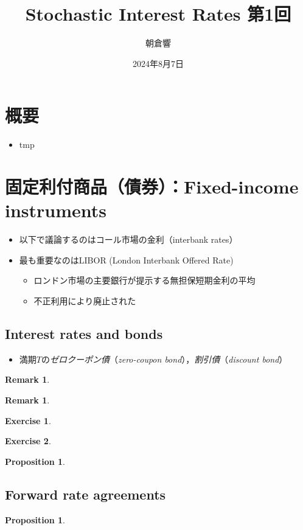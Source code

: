 \documentclass[a4paper, lualatex, ja=standard]{bxjsarticle}
\title{Stochastic Interest Rates 第1回}
\author{朝倉響}
\date{2024年8月7日}
\theoremstyle{theorem}
\newtheorem{prop}[thm]{Proposition}
\theoremstyle{definition}
\newtheorem{rem}[thm]{Remark}
\newtheorem{excs}{Exercise}[section]
\begin{document}
\maketitle

\section*{概要}
\begin{itemize}
  \item tmp
\end{itemize}

\section{固定利付商品（債券）：Fixed-income instruments}
\begin{itemize}
  \item 以下で議論するのはコール市場の金利（interbank rates）
  \item 最も重要なのはLIBOR (London Interbank Offered Rate)
  \begin{itemize}
    \item ロンドン市場の主要銀行が提示する無担保短期金利の平均
    \item 不正利用により廃止された
  \end{itemize}
\end{itemize}
\subsection{Interest rates and bonds}
\begin{itemize}
  \item 満期$T$の\emph{ゼロクーポン債}（\emph{zero-coupon bond}），\emph{割引債}（\emph{discount bond}）
\end{itemize}
\begin{rem}
\end{rem}

\begin{rem}
\end{rem}

\begin{excs}
\end{excs}

\begin{excs}
\end{excs}

\begin{prop}
\end{prop}

\subsection{Forward rate agreements}
\begin{prop}
\end{prop}
\end{document}
